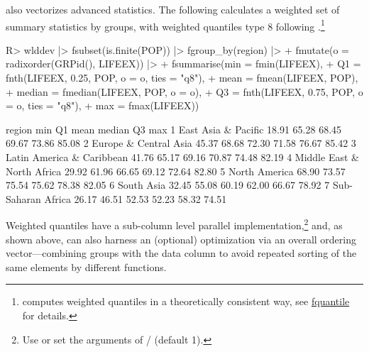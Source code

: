 \documentclass[article]{jss} %
\newcommand{\class}[1]{`\code{#1}'}
\newcommand{\fct}[1]{\code{#1()}}
\begin{document}
 also vectorizes advanced statistics. The following calculates a weighted set of summary statistics by groups, with weighted quantiles type 8 following \citet{hyndman1996sample}.\footnote{ computes weighted quantiles in a theoretically consistent way, see \href{https://sebkrantz.github.io/collapse/reference/fquantile.html}{fquantile} for details.}
%
\begin{Schunk}
\begin{Sinput}
R> wlddev |> fsubset(is.finite(POP)) |> fgroup_by(region) |>
+    fmutate(o = radixorder(GRPid(), LIFEEX)) |>
+    fsummarise(min = fmin(LIFEEX),
+               Q1 = fnth(LIFEEX, 0.25, POP, o = o, ties = "q8"),
+               mean = fmean(LIFEEX, POP),
+               median = fmedian(LIFEEX, POP, o = o),
+               Q3 = fnth(LIFEEX, 0.75, POP, o = o, ties = "q8"),
+               max = fmax(LIFEEX))
\end{Sinput}
\begin{Soutput}
                      region   min    Q1  mean median    Q3   max
1        East Asia & Pacific 18.91 65.28 68.45  69.67 73.86 85.08
2      Europe & Central Asia 45.37 68.68 72.30  71.58 76.67 85.42
3  Latin America & Caribbean 41.76 65.17 69.16  70.87 74.48 82.19
4 Middle East & North Africa 29.92 61.96 66.65  69.12 72.64 82.80
5              North America 68.90 73.57 75.54  75.62 78.38 82.05
6                 South Asia 32.45 55.08 60.19  62.00 66.67 78.92
7         Sub-Saharan Africa 26.17 46.51 52.53  52.23 58.32 74.51
\end{Soutput}
\end{Schunk}
%
Weighted quantiles have a sub-column level parallel implementation,\footnote{Use  or set the  arguments of \fct{fnth}/\fct{fmedian} (default 1).} and, as shown above, can also harness an (optional) optimization via an overall ordering vector---combining groups with the data column to avoid repeated sorting of the same elements by different functions. %
%
%
%
\end{document}
